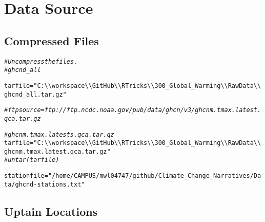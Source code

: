 \documentclass{article}\usepackage[]{graphicx}\usepackage[]{color}
\makeatletter
\newcommand{\hlstr}[1]{\textcolor[rgb]{0.192,0.494,0.8}{#1}}%
\newcommand{\hlcom}[1]{\textcolor[rgb]{0.678,0.584,0.686}{\textit{#1}}}%
\newcommand{\hlstd}[1]{\textcolor[rgb]{0.345,0.345,0.345}{#1}}%
\newcommand{\hlkwb}[1]{\textcolor[rgb]{0.69,0.353,0.396}{#1}}%
\newenvironment{kframe}{%
 \def\at@end@of@kframe{}%
 \ifinner\ifhmode%
  \def\at@end@of@kframe{\end{minipage}}%
  \begin{minipage}{\columnwidth}%
 \fi\fi%
 \def\FrameCommand##1{\hskip\@totalleftmargin \hskip-\fboxsep
 \colorbox{shadecolor}{##1}\hskip-\fboxsep
     \hskip-\linewidth \hskip-\@totalleftmargin \hskip\columnwidth}%
 \MakeFramed {\advance\hsize-\width
   \@totalleftmargin\z@ \linewidth\hsize
   \@setminipage}}%
 {\par\unskip\endMakeFramed%
 \at@end@of@kframe}
\newenvironment{knitrout}{}{} %
\makeatother
\begin{document}
\section{Data Source}


\subsection{Compressed Files}


\begin{knitrout}
\color{fgcolor}\begin{kframe}
\begin{alltt}
\hlcom{# Uncompress the files.}
\hlcom{# ghcnd_all}

\hlstd{tarfile} \hlkwb{=} \hlstr{"C:\textbackslash{}\textbackslash{}workspace\textbackslash{}\textbackslash{}GitHub\textbackslash{}\textbackslash{}RTricks\textbackslash{}\textbackslash{}300_Global_Warming\textbackslash{}\textbackslash{}Raw Data\textbackslash{}\textbackslash{}ghcnd_all.tar.gz"}

\hlcom{#ftpsource = ftp://ftp.ncdc.noaa.gov/pub/data/ghcn/v3/ghcnm.tmax.latest.qca.tar.gz}


\hlcom{#ghcnm.tmax.latests.qca.tar.qz}
\hlstd{tarfile} \hlkwb{=} \hlstr{"C:\textbackslash{}\textbackslash{}workspace\textbackslash{}\textbackslash{}GitHub\textbackslash{}\textbackslash{}RTricks\textbackslash{}\textbackslash{}300_Global_Warming\textbackslash{}\textbackslash{}Raw Data\textbackslash{}\textbackslash{}ghcnm.tmax.latest.qca.tar.gz"}
\hlcom{# untar(tarfile)}
\end{alltt}
\end{kframe}
\end{knitrout}


\begin{knitrout}
\color{fgcolor}\begin{kframe}
\begin{alltt}
\hlstd{stationfile} \hlkwb{=} \hlstr{"/home/CAMPUS/mwl04747/github/Climate_Change_Narratives/Data/ghcnd-stations.txt"}
\end{alltt}
\end{kframe}
\end{knitrout}

\subsection{Uptain Locations}
\end{document}
